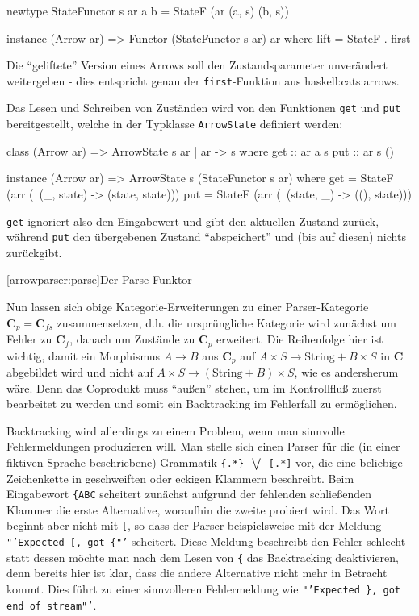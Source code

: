 \documentclass[11pt, a4paper, bibgerm]{scrbook}
\newcommand\icode[1]{\lstinline?#1?}
\newcommand\lsection{}
\newcommand\sref{}
\newcommand\ato{\rightarrow} %
\begin{document}
\begin{code}
newtype StateFunctor s ar a b = StateF (ar (a, s) (b, s))

instance (Arrow ar) => Functor (StateFunctor s ar) ar where
    lift = StateF . first
\end{code} %

Die "`geliftete"' Version eines Arrows soll den Zustandsparameter
unverändert weitergeben - dies entspricht genau der
\icode{first}-Funktion aus \sref{haskell:cats:arrows}.

Das Lesen und Schreiben von Zuständen wird von den Funktionen \icode{get} und
\icode{put} bereitgestellt, welche in der Typklasse \icode{ArrowState}
definiert werden:

\begin{code}
class (Arrow ar) => ArrowState s ar | ar -> s where
  get :: ar a s
  put :: ar s ()

instance (Arrow ar) => ArrowState s (StateFunctor s ar)
  where
    get = StateF (arr (\ (_, state) -> (state, state)))
    put = StateF (arr (\ (state, _) -> ((), state)))
\end{code}

\icode{get} ignoriert also den Eingabewert und gibt den aktuellen
Zustand zurück, während \icode{put} den übergebenen Zustand
"`abspeichert"' und (bis auf diesen) nichts zurückgibt.

\lsection[arrowparser:parse]{Der Parse-Funktor}

Nun lassen sich obige Kategorie-Erweiterungen zu einer Parser-Kategorie
$\mathbf{C}_p = \mathbf{C}_{fs}$ zusammensetzen, d.h. die ursprüngliche
Kategorie wird zunächst um Fehler zu $\mathbf{C}_f$, danach um Zustände
zu $\mathbf{C}_p$ erweitert. Die Reihenfolge hier ist wichtig, damit ein
Morphismus $A \ato B$ aus $\mathbf{C}_p$ auf $A \times S \ato
\mathrm{String} + B \times S$ in $\mathbf{C}$ abgebildet wird und nicht
auf $A \times S \ato (\mathrm{String} + B) \times S$, wie es andersherum
wäre. Denn das Coprodukt muss "`außen"' stehen, um im Kontrollfluß
zuerst bearbeitet zu werden und somit ein Backtracking im Fehlerfall zu
ermöglichen.

Backtracking wird allerdings zu einem Problem, wenn man sinnvolle
Fehlermeldungen produzieren will. Man stelle sich einen Parser für die
(in einer fiktiven Sprache beschriebene) Grammatik \texttt{\{.*\}
  $\bigvee$ [.*]} vor, die eine beliebige Zeichenkette in geschweiften
oder eckigen Klammern beschreibt. Beim Eingabewort \texttt{\{ABC}
scheitert zunächst aufgrund der fehlenden schließenden Klammer die erste
Alternative, woraufhin die zweite probiert wird. Das Wort beginnt aber
nicht mit \texttt{[}, so dass der Parser beispielsweise mit der Meldung
\texttt{"'Expected [, got \{"'} scheitert. Diese Meldung beschreibt den
Fehler schlecht - statt dessen möchte man nach dem Lesen von \texttt{\{}
das Backtracking deaktivieren, denn bereits hier ist klar, dass die
andere Alternative nicht mehr in Betracht kommt. Dies führt zu einer
sinnvolleren Fehlermeldung wie \texttt{"'Expected \}, got end of
  stream"'}.
\end{document}
